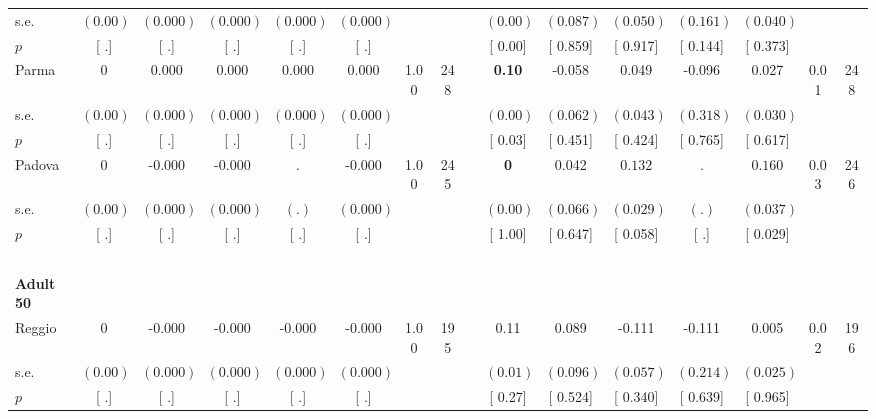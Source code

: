 \begin{longtable}{L{8em} c c c c c c c p{1em} c c c c c c c}
\quad \quad \quad \quad s.e.& $ (     0.00)$ & $ (    0.000)$ & $ (    0.000)$ & $ (    0.000)$ & $ (    0.000)$ & & & & $ (     0.00)$ & $ (    0.087)$ & $ (    0.050)$ & $ (    0.161)$ & $ (    0.040)$ & &  \\*
\quad \quad \quad \quad $ p$ & [        .] & [        .] & [        .] & [        .] & [        .] & & & & [     0.00] & [    0.859] & [    0.917] & [    0.144] & [    0.373] & &  \\[1em]
\quad \quad \quad Parma& 0 &     0.000 &     0.000 &     0.000 &     0.000 &      1.00 &       248 & & \textbf{     0.10} &    -0.058 &     0.049 &    -0.096 &     0.027 &      0.01 &       248  \\*
\quad \quad \quad \quad s.e.& $ (     0.00)$ & $ (    0.000)$ & $ (    0.000)$ & $ (    0.000)$ & $ (    0.000)$ & & & & $ (     0.00)$ & $ (    0.062)$ & $ (    0.043)$ & $ (    0.318)$ & $ (    0.030)$ & &  \\*
\quad \quad \quad \quad $ p$ & [        .] & [        .] & [        .] & [        .] & [        .] & & & & [     0.03] & [    0.451] & [    0.424] & [    0.765] & [    0.617] & &  \\[1em]
\quad \quad \quad Padova& 0 &    -0.000 &    -0.000 &         . &    -0.000 &      1.00 &       245 & & \textbf{0} &     0.042 & $ \mathbf{    0.132}$ &         . & $ \mathbf{    0.160}$ &      0.03 &       246  \\*
\quad \quad \quad \quad s.e.& $ (     0.00)$ & $ (    0.000)$ & $ (    0.000)$ & $ (        .)$ & $ (    0.000)$ & & & & $ (     0.00)$ & $ (    0.066)$ & $ (    0.029)$ & $ (        .)$ & $ (    0.037)$ & &  \\*
\quad \quad \quad \quad $ p$ & [        .] & [        .] & [        .] & [        .] & [        .] & & & & [     1.00] & [    0.647] & [    0.058] & [        .] & [    0.029] & &  \\[1em]
~\\[1em]
\quad \quad \textbf{Adult 50} & & & & & & & & & & & & & & & \\* 
\quad \quad \quad Reggio& 0 &    -0.000 &    -0.000 &    -0.000 &    -0.000 &      1.00 &       195 & & 0.11 &     0.089 &    -0.111 &    -0.111 &     0.005 &      0.02 &       196  \\*
\quad \quad \quad \quad s.e.& $ (     0.00)$ & $ (    0.000)$ & $ (    0.000)$ & $ (    0.000)$ & $ (    0.000)$ & & & & $ (     0.01)$ & $ (    0.096)$ & $ (    0.057)$ & $ (    0.214)$ & $ (    0.025)$ & &  \\*
\quad \quad \quad \quad $ p$ & [        .] & [        .] & [        .] & [        .] & [        .] & & & & [     0.27] & [    0.524] & [    0.340] & [    0.639] & [    0.965] & &  \\[1em]

\end{longtable}
